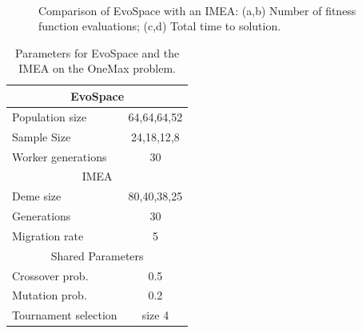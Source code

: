 \begin{figure}[t]
{    }
    \\
    \caption{
    Comparison of EvoSpace with an IMEA: (a,b) Number of fitness function evaluations; (c,d) Total time to solution.}
    \label{fig:island}
\end{figure}


\begin{table}[t]
\renewcommand{\arraystretch}{1.3}
\caption{Parameters for EvoSpace and the IMEA on the OneMax problem.}
\label{tab:exp3}
\centering
\begin{tabular}{|l||c|}
\hline
\multicolumn{2}{|c|}{EvoSpace} \\
\hline
Population size & 64,64,64,52 \\
Sample Size & 24,18,12,8 \\
Worker generations & 30 \\
\hline
\multicolumn{2}{|c|}{IMEA} \\
\hline
Deme size & 80,40,38,25 \\
Generations & 30 \\
Migration rate & 5 \\
\hline
\multicolumn{2}{|c|}{Shared Parameters} \\
\hline
Crossover prob. & 0.5 \\
Mutation prob.  & 0.2 \\
Tournament selection & size 4 \\
\hline
\end{tabular}
\end{table}


